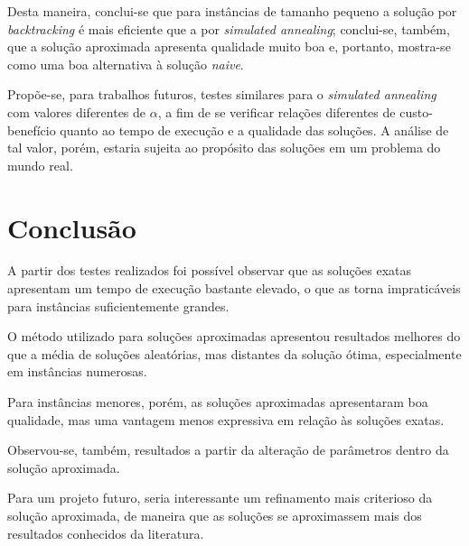 \documentclass[a4paper, 12pt]{article}
\begin{document}
Desta maneira, conclui-se que para instâncias de tamanho pequeno a solução por \textit{backtracking} é mais eficiente que a por \textit{simulated annealing}; conclui-se, também, que a solução aproximada apresenta qualidade muito boa e, portanto, mostra-se como uma boa alternativa à solução \textit{naive}.

Propõe-se, para trabalhos futuros, testes similares para o \textit{simulated annealing} com valores diferentes de $\alpha$, a fim de se verificar relações diferentes de custo-benefício quanto ao tempo de execução e a qualidade das soluções. A análise de tal valor, porém, estaria sujeita ao propósito das soluções em um problema do mundo real. 









\clearpage
\newpage


\section{Conclusão}

A partir dos testes realizados foi possível observar que as soluções exatas apresentam um tempo de execução bastante elevado, o que as torna impraticáveis para instâncias suficientemente grandes.

O método utilizado para soluções aproximadas apresentou resultados melhores do que a média de soluções aleatórias, mas distantes da solução ótima, especialmente em instâncias numerosas.

Para instâncias menores, porém, as soluções aproximadas apresentaram boa qualidade, mas uma vantagem menos expressiva em relação às soluções exatas.

Observou-se, também, resultados a partir da alteração de parâmetros dentro da solução aproximada.

Para um projeto futuro, seria interessante um refinamento mais criterioso da solução aproximada, de maneira que as soluções se aproximassem mais dos resultados conhecidos da literatura.


\newpage



\newpage
{}
\end{document}
